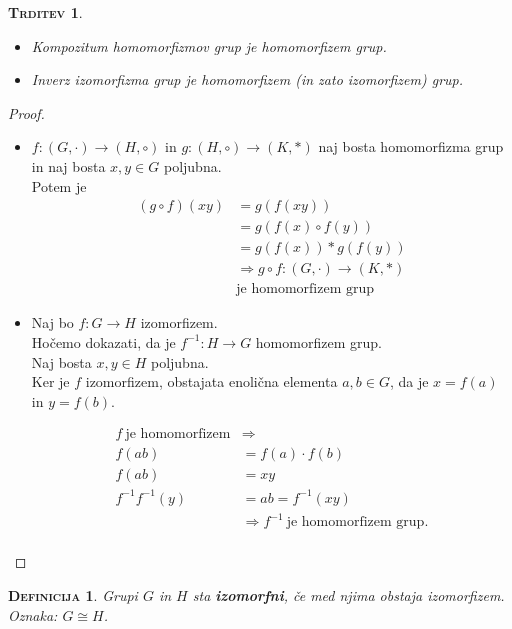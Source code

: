 \documentclass[a4paper,12pt]{article}
\newtheorem*{trditev}{\textsc{Trditev}}
\newtheorem*{definicija}{\textsc{Definicija}}
\begin{document}
\begin{trditev}
~
\begin{itemize}
\item[(a)] Kompozitum homomorfizmov grup je homomorfizem grup.
\item[(b)] Inverz izomorfizma grup je homomorfizem (in zato izomorfizem) grup.\\
\end{itemize}
\end{trditev}

\begin{proof}
~
\begin{itemize}
\item[(a)] $f:(G,\cdot)\to (H,\circ)$ in $g:(H,\circ)\to(K,*)$ naj bosta homomorfizma grup in naj bosta $x,y\in G$ poljubna. \\

Potem je
\begin{align*}
(g\circ f)(xy) & = g(f(xy)) \\
& = g(f(x)\circ f(y)) \\
& = g(f(x))*g(f(y)) \\
& \Rightarrow g \circ f: (G,\cdot)\to(K,*)\\
& \text{je homomorfizem grup}
\end{align*}

\item[(b)] Naj bo $f:G\to H$ izomorfizem. \\

Hočemo dokazati, da je $f^{-1}:H\to G$ homomorfizem grup.\\ 

Naj bosta $x,y\in H$ poljubna. \\

Ker je $f$ izomorfizem, obstajata enolična elementa $a,b\in G$, da je $x=f(a)$ in $y=f(b)$. 

\begin{align*}
f ~ \text{je homomorfizem} & \Rightarrow \\
f(ab)& =f(a)\cdot f(b) \\
f(ab)&=xy \\
f^{-1}f^{-1}(y)& =ab=f^{-1}(xy) \\
& \Rightarrow f^{-1}~ \text{je homomorfizem grup}.\\
\end{align*}
\end{itemize}
\end{proof}

\begin{definicija}
Grupi $G$ in $H$ sta \textbf{izomorfni}, če med njima obstaja \linebreak izomorfizem. Oznaka: $G \cong H$.\\
\end{definicija}
\end{document}
